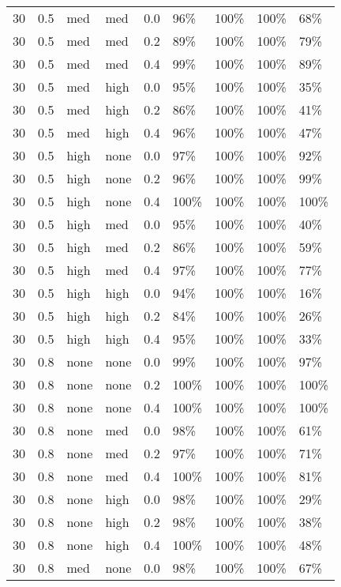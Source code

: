 \begin{longtable}{rrllrllll}
  30 & 0.5 & med & med & 0.0 & 96\% & 100\% & 100\% & 68\% \\ 
  30 & 0.5 & med & med & 0.2 & 89\% & 100\% & 100\% & 79\% \\ 
  30 & 0.5 & med & med & 0.4 & 99\% & 100\% & 100\% & 89\% \\ 
  30 & 0.5 & med & high & 0.0 & 95\% & 100\% & 100\% & 35\% \\ 
  30 & 0.5 & med & high & 0.2 & 86\% & 100\% & 100\% & 41\% \\ 
  30 & 0.5 & med & high & 0.4 & 96\% & 100\% & 100\% & 47\% \\ 
  30 & 0.5 & high & none & 0.0 & 97\% & 100\% & 100\% & 92\% \\ 
  30 & 0.5 & high & none & 0.2 & 96\% & 100\% & 100\% & 99\% \\ 
  30 & 0.5 & high & none & 0.4 & 100\% & 100\% & 100\% & 100\% \\ 
  30 & 0.5 & high & med & 0.0 & 95\% & 100\% & 100\% & 40\% \\ 
  30 & 0.5 & high & med & 0.2 & 86\% & 100\% & 100\% & 59\% \\ 
  30 & 0.5 & high & med & 0.4 & 97\% & 100\% & 100\% & 77\% \\ 
  30 & 0.5 & high & high & 0.0 & 94\% & 100\% & 100\% & 16\% \\ 
  30 & 0.5 & high & high & 0.2 & 84\% & 100\% & 100\% & 26\% \\ 
  30 & 0.5 & high & high & 0.4 & 95\% & 100\% & 100\% & 33\% \\ 
  30 & 0.8 & none & none & 0.0 & 99\% & 100\% & 100\% & 97\% \\ 
  30 & 0.8 & none & none & 0.2 & 100\% & 100\% & 100\% & 100\% \\ 
  30 & 0.8 & none & none & 0.4 & 100\% & 100\% & 100\% & 100\% \\ 
  30 & 0.8 & none & med & 0.0 & 98\% & 100\% & 100\% & 61\% \\ 
  30 & 0.8 & none & med & 0.2 & 97\% & 100\% & 100\% & 71\% \\ 
  30 & 0.8 & none & med & 0.4 & 100\% & 100\% & 100\% & 81\% \\ 
  30 & 0.8 & none & high & 0.0 & 98\% & 100\% & 100\% & 29\% \\ 
  30 & 0.8 & none & high & 0.2 & 98\% & 100\% & 100\% & 38\% \\ 
  30 & 0.8 & none & high & 0.4 & 100\% & 100\% & 100\% & 48\% \\ 
  30 & 0.8 & med & none & 0.0 & 98\% & 100\% & 100\% & 67\% \\ 

\end{longtable}
